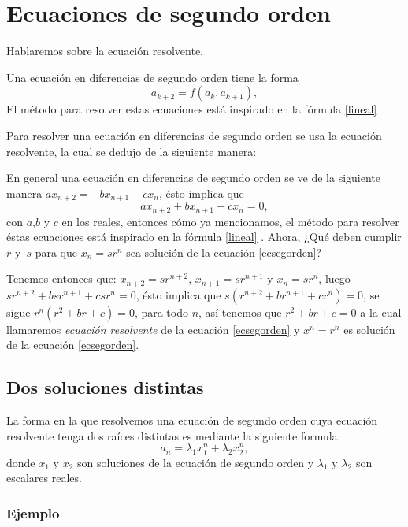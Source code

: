 \documentclass{article}
\begin{document}
\section{Ecuaciones de segundo orden}

Hablaremos sobre la ecuación resolvente.

Una ecuación en diferencias de segundo orden tiene la forma
\begin{equation}
  \label{ecsegorden1}
  a_{k+2}=f(a_k,a_{k+1}),
\end{equation}
El método para resolver estas ecuaciones está inspirado en la fórmula \eqref{lineal} 

Para resolver una ecuación en diferencias de segundo orden se usa la
ecuación resolvente, la cual se dedujo de la siguiente manera:

En general una ecuación en diferencias de segundo orden se ve de la
siguiente manera $ax_{n+2}=-bx_{n+1}-cx_{n}$, ésto implica que
\begin{equation}
  \label{ecsegorden}
  ax_{n+2}+bx_{n+1}+cx_{n}=0,
\end{equation}
con $a$,$b$ y $c$ en los reales, entonces cómo ya mencionamos, el método
para resolver éstas ecuaciones está inspirado en la fórmula \eqref{lineal}
. Ahora, ¿Qué deben cumplir $r$ y~$s$ para que $x_n=sr^n$
sea solución de la ecuación \eqref{ecsegorden}?

Tenemos entonces que: $x_{n+2}=sr^{n+2}$, $x_{n+1}=sr^{n+1}$ y
$x_{n}=sr^{n}$, luego $sr^{n+2}+bsr^{n+1}+csr^n=0$, ésto implica que
$s(r^{n+2}+br^{n+1}+cr^n)=0$, se sigue $r^n(r^2+br+c)=0$, para todo
$n$, así tenemos que $r^2+br+c=0$ a la cual llamaremos
\textit{ecuación resolvente} de la ecuación \eqref{ecsegorden} y
$x^n=r^n$ es solución de la ecuación \eqref{ecsegorden}.



\subsection{Dos soluciones distintas}
\label{sec:distintas}
La forma en la que resolvemos una ecuación de segundo orden cuya
ecuación resolvente tenga dos raíces distintas es mediante la
siguiente formula:
\begin{equation}
 \label{raicesdistintas}
 a_n=\lambda_1x_1^n +\lambda_2x_2^n,
\end{equation}
donde $x_1$ y $x_2$ son soluciones de la ecuación de segundo orden y
$\lambda_1$ y $\lambda_2$ son escalares reales.
\subsubsection{Ejemplo}
\end{document}
